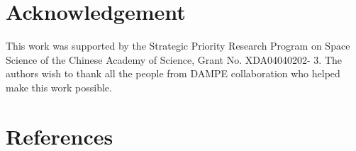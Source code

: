 \documentclass[5p, times]{elsarticle}
\begin{document}
\section*{Acknowledgement}
\label{sec:acknowledgement}

This work was supported by the Strategic Priority Research Program on Space Science of the Chinese Academy of Science,
Grant No. XDA04040202- 3.
The authors wish to thank all the people from DAMPE collaboration who helped make this work possible.

\section*{References}
\label{sec:reference}



\end{document}
